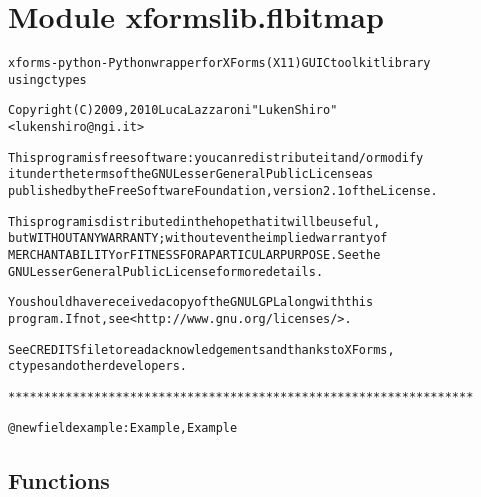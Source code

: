 %
%
%


\section{Module xformslib.flbitmap}

    \label{xformslib:flbitmap}
\begin{alltt}

xforms-python - Python wrapper for XForms (X11) GUI C toolkit library
using ctypes

Copyright (C) 2009, 2010  Luca Lazzaroni "LukenShiro"
    {\textless}lukenshiro@ngi.it{\textgreater}

This program is free software: you can redistribute it and/or modify
it under the terms of the GNU Lesser General Public License as
published by the Free Software Foundation, version 2.1 of the License.

This program is distributed in the hope that it will be useful,
but WITHOUT ANY WARRANTY; without even the implied warranty of
MERCHANTABILITY or FITNESS FOR A PARTICULAR PURPOSE. See the
GNU Lesser General Public License for more details.

You should have received a copy of the GNU LGPL along with this
program. If not, see {\textless}http://www.gnu.org/licenses/{\textgreater}.

See CREDITS file to read acknowledgements and thanks to XForms,
ctypes and other developers.

*****************************************************************


@newfield example: Example, Example
\end{alltt}



  \subsection{Functions}

